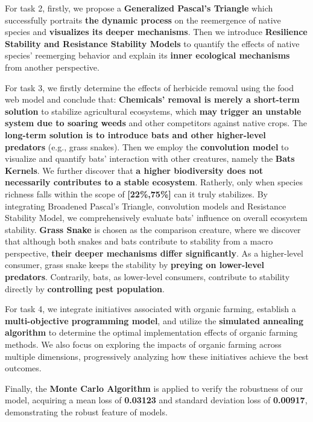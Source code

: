 \documentclass[12pt]{article}
\begin{document}
For task 2, firstly, we propose a \textbf{Generalized Pascal's Triangle }which successfully portraits \textbf{the dynamic process} on the reemergence of native species and \textbf{visualizes its deeper mechanisms}. Then we introduce \textbf{Resilience Stability and Resistance Stability Models} to quantify the effects of native species' reemerging behavior and explain its \textbf{inner ecological mechanisms} from another perspective.

For task 3, we firstly determine the effects of herbicide removal using the food web model and conclude that: \textbf{Chemicals' removal is merely a short-term solution} to stabilize agricultural ecosystems, which \textbf{may trigger an unstable system due to soaring weeds} and other competitors against native crops. The \textbf{long-term solution is to introduce bats and other higher-level predators} (e.g., grass snakes). Then we employ the \textbf{convolution model} to visualize and quantify bats' interaction with other creatures, namely the \textbf{Bats Kernels}. We further discover that \textbf{a higher biodiversity does not necessarily contributes to a stable ecosystem}. Ratherly, only when species richness falls within the scope of \textbf{[22\%,75\%]} can it truly stabilizes. By integrating Broadened Pascal's Triangle, convolution models and Resistance Stability Model, we comprehensively evaluate bats' influence on overall ecosystem stability. \textbf{Grass Snake} is chosen as the comparison creature, where we discover that although both snakes and bats contribute to stability from a macro perspective, \textbf{their deeper mechanisms differ significantly}. As a higher-level consumer, grass snake keeps the stability by \textbf{preying on lower-level predators}. Contrarily, bats, as lower-level consumers, contribute to stability directly by \textbf{controlling pest population}.  

For task 4, we integrate initiatives associated with organic farming, establish a \textbf{multi-objective programming model}, and utilize the \textbf{simulated annealing algorithm} to determine the optimal implementation effects of organic farming methods. We also focus on exploring the impacts of organic farming across multiple dimensions, progressively analyzing how these initiatives achieve the best outcomes.

Finally, the \textbf{Monte Carlo Algorithm} is applied to verify the robustness of our model, acquiring a mean loss of \textbf{0.03123} and standard deviation loss  of \textbf{0.00917}, demonstrating the robust feature of  models. 
\end{document}

